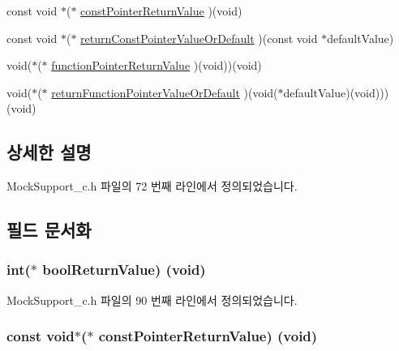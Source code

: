 \begin{DoxyCompactItemize}
\item 
const void $\ast$($\ast$ \hyperlink{struct_s_mock_actual_call__c_a1794c81a61ac14c7be1f2acfd000611f}{const\+Pointer\+Return\+Value} )(void)
\item 
const void $\ast$($\ast$ \hyperlink{struct_s_mock_actual_call__c_addb8be61d99e230985589991a3789da2}{return\+Const\+Pointer\+Value\+Or\+Default} )(const void $\ast$default\+Value)
\item 
void($\ast$($\ast$ \hyperlink{struct_s_mock_actual_call__c_a808d27a78eeec5e62fe36759b8da147b}{function\+Pointer\+Return\+Value} )(void))(void)
\item 
void($\ast$($\ast$ \hyperlink{struct_s_mock_actual_call__c_ab5269cbc4eeedac5d28749d686d40b1b}{return\+Function\+Pointer\+Value\+Or\+Default} )(void($\ast$default\+Value)(void)))(void)
\end{DoxyCompactItemize}


\subsection{상세한 설명}


Mock\+Support\+\_\+c.\+h 파일의 72 번째 라인에서 정의되었습니다.



\subsection{필드 문서화}
\subsubsection[{\texorpdfstring{bool\+Return\+Value}{boolReturnValue}}]{\setlength{\rightskip}{0pt plus 5cm}int($\ast$ bool\+Return\+Value) (void)}\hypertarget{struct_s_mock_actual_call__c_a5eef7e37626ba5f69b251748055a97e6}{}\label{struct_s_mock_actual_call__c_a5eef7e37626ba5f69b251748055a97e6}


Mock\+Support\+\_\+c.\+h 파일의 90 번째 라인에서 정의되었습니다.

\subsubsection[{\texorpdfstring{const\+Pointer\+Return\+Value}{constPointerReturnValue}}]{\setlength{\rightskip}{0pt plus 5cm}const void$\ast$($\ast$ const\+Pointer\+Return\+Value) (void)}\hypertarget{struct_s_mock_actual_call__c_a1794c81a61ac14c7be1f2acfd000611f}{}\label{struct_s_mock_actual_call__c_a1794c81a61ac14c7be1f2acfd000611f}



